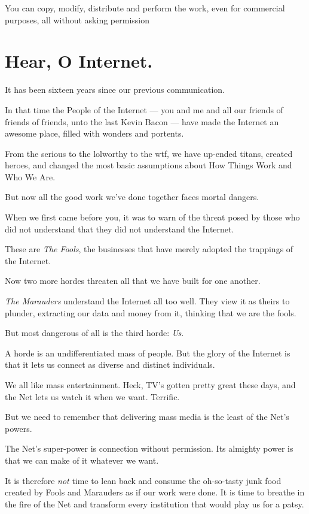 \documentclass[letterpaper,12pt,english]{sphinxmanual}
\begin{document}
You can copy, modify, distribute and perform the work, even for commercial purposes, all without asking permission


\section{Hear, O Internet.}
\label{2015newclues:hear-o-internet}
It has been sixteen years since our previous communication.

In that time the People of the Internet — you and me and all our friends of friends of friends, unto the last Kevin Bacon — have made the Internet an awesome place, filled with wonders and portents.

From the serious to the lolworthy to the wtf, we have up-ended titans, created heroes,  and changed the most basic assumptions about
How Things Work and Who We Are.

But now all the good work we've done together faces mortal dangers.

When we first came before you, it was to warn of the threat posed by those who did not understand that they did not understand the Internet.

These are \emph{The Fools}, the businesses that have merely adopted the trappings of the Internet.

Now two more hordes threaten all that we have built for one another.

\emph{The Marauders} understand the Internet all too well. They view it as theirs to plunder, extracting our data and money from it, thinking that we are the fools.

But most dangerous of all is the third horde: \emph{Us}.

A horde is an undifferentiated mass of people. But the glory of the Internet is that it lets us connect as diverse and distinct individuals.

We all like mass entertainment. Heck, TV's gotten pretty great these days, and the Net lets us watch it when we want. Terrific.

But we need to remember that delivering mass media is the least of the Net's powers.

The Net's super-power is connection without permission. Its almighty power is that we can make of it whatever we want.

It is therefore \emph{not} time to lean back and consume the oh-so-tasty junk food created by Fools and Marauders as if our work were done. It is time to breathe in the fire of the Net and transform every institution that would play us for a patsy.
\end{document}

